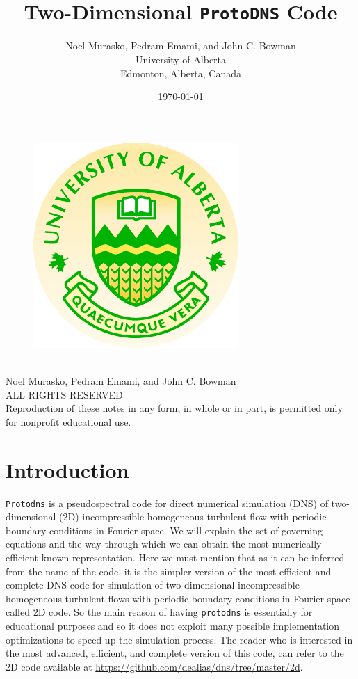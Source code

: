 \documentclass[12pt]{article}
\title{\huge{\textbf{\\Two-Dimensional {\tt ProtoDNS} Code}}}
\author{Noel Murasko, Pedram Emami, and John C. Bowman\\University of Alberta\\Edmonton,
  Alberta, Canada}
\date{\today}
\begin{document}
\maketitle

\thispagestyle{empty}
\begin{figure}[h]
\centering
\includegraphics{uofa}
\end{figure}
\newpage
\thispagestyle{empty}
\begin{center}
\ \vspace{20cm}\\
Noel Murasko, Pedram Emami, and John C. Bowman\\
ALL RIGHTS RESERVED\\
Reproduction of these notes in any form, in whole or in part, is permitted only for nonprofit educational use.
\end{center}
\newpage

\section{Introduction}
{\tt Protodns} is a pseudospectral code for
direct numerical simulation (DNS) of two-dimensional (2D) incompressible homogeneous
  turbulent flow with periodic boundary conditions in Fourier space. We
  will explain the set of governing equations and the way through which we
  can obtain the most numerically efficient known representation.
Here we must mention that as it can be inferred from the name of the code, it is the simpler version of the most efficient and complete DNS code for simulation of two-dimensional incompressible homogeneous turbulent flows with periodic boundary conditions in Fourier space called 2D code. So the main reason of having {\tt protodns} is essentially for educational purposes and so it does not exploit many possible implementation optimizations to speed up the simulation process. The reader who is interested in the most advanced, efficient, and complete version of this code, can refer to the 2D code available at \url{https://github.com/dealias/dns/tree/master/2d}.
%
\end{document}
